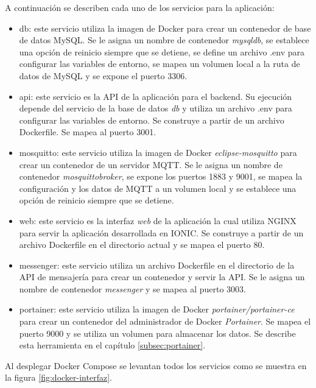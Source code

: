 A continuación se describen cada uno de los servicios para la aplicación:

\begin{itemize}

\item db: este servicio utiliza la imagen de Docker para crear un contenedor de base de datos MySQL. Se le asigna un nombre de contenedor \textit{mysqldb}, se establece una opción de reinicio siempre que se detiene, se define un archivo .env para configurar las variables de entorno, se mapea un volumen local a la ruta de datos de MySQL y se expone el puerto 3306.

\item api: este servicio es la API de la aplicación para el backend. Su ejecución depende del servicio de la base de datos \textit{db} y utiliza un archivo .env para configurar las variables de entorno. Se construye a partir de un archivo Dockerfile. Se mapea al puerto 3001.

\item mosquitto: este servicio utiliza la imagen de Docker \textit{eclipse-mosquitto} para crear un contenedor de un servidor MQTT. Se le asigna un nombre de contenedor \textit{mosquittobroker}, se expone los puertos 1883 y 9001, se mapea la configuración y los datos de MQTT a un volumen local y se establece una opción de reinicio siempre que se detiene.

\item web: este servicio es la interfaz \textit{web} de la aplicación la cual utiliza NGINX para servir la aplicación desarrollada en IONIC. Se construye a partir de un archivo Dockerfile en el directorio actual y se mapea el puerto 80.

\item messenger: este servicio utiliza un archivo Dockerfile en el directorio de la API de mensajería para crear un contenedor y servir la API. Se le asigna un nombre de contenedor \textit{messenger} y se mapea al puerto 3003.

\item portainer: este servicio utiliza la imagen de Docker \textit{portainer/portainer-ce} para crear un contenedor del administrador de Docker \textit{Portainer}. Se mapea el puerto 9000 y se utiliza un volumen para almacenar los datos. Se describe esta herramienta en el capítulo \ref{subsec:portainer}.
\end{itemize}

Al desplegar Docker Compose se levantan todos los servicios como se muestra en la figura \ref{fig:docker-interfaz}.

